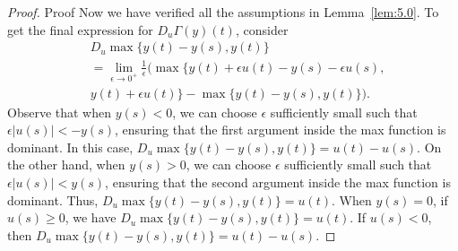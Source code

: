 \documentclass[11pt,leqno]{amsart}
\begin{document}
\begin{proof}{Proof}
Now we have verified all the assumptions in Lemma~\ref{lem:5.0}.
To get the final expression for $D_u\Gamma(y)(t)$, consider
\begin{align*}
    &D_u \max\{y(t)-y(s), y(t)\}\\
    &=\lim_{\epsilon\to 0^+}\frac{1}{\epsilon}\Bigg(\max\Big\{y(t)+\epsilon u(t)-y(s)-\epsilon u(s),\\& y(t)+\epsilon u(t)\Big\}- \max\Big\{y(t)-y(s), y(t)\Big\}\Bigg).
\end{align*}
Observe that when $y(s)<0$,  we can choose $\epsilon$ sufficiently small such that $\epsilon|u(s)|< -y(s)$, ensuring that the first argument inside the max function is dominant. In this case, $D_u \max\{y(t)-y(s), y(t)\}=u(t)-u(s)$. On the other hand, when $y(s)>0$, we can choose $\epsilon$ sufficiently small such that $\epsilon|u(s)|< y(s)$, ensuring that the second argument inside the max function is dominant. Thus, $D_u \max\{y(t)-y(s), y(t)\}=u(t)$. When $y(s)=0$, if $u(s)\geq 0$, we have $D_u \max\{y(t)-y(s), y(t)\}=u(t)$. If $u(s)<0$, then $D_u \max\{y(t)-y(s), y(t)\}=u(t)-u(s)$. 


\end{proof}
\end{document}
